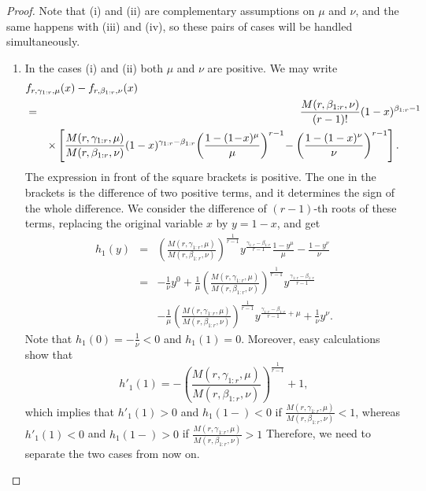 \documentclass [11pt]{article}
\begin{document}
\begin{proof}
Note that (i) %
and (ii) %
are complementary assumptions on $\mu$ and $\nu$, and the same happens with (iii) %
and (iv), %
so these pairs of cases will be handled simultaneously.
\begin{enumerate}%
\item[(a)]
In the cases (i) and (ii) %
both $\mu$  and $\nu$ are positive. We may write
\begin{eqnarray}
\lefteqn{f_{r,\gamma_{1:r},\mu}(x) - f_{r,\beta_{1:r},\nu}(x)} \nonumber \\
 & = &
\frac{M(r,\beta_{1:r},\nu)}{(r-1)!}(1-x)^{\beta_{1:r}-1} \nonumber \\
 & & \times
 \left[\frac{M(r,\gamma_{1:r},\mu)}{M(r,\beta_{1:r},\nu)}
  (1-x)^{\gamma_{1:r}-\beta_{1:r}}
\! \left( \frac{1-(1\!-\!x)^\mu}{\mu}\right)^{r-1}
\! - \left( \frac{1-(1-x)^\nu}{\nu}\right)^{r-1}\right].\qquad 
\label{4}
\end{eqnarray}
The expression in front of the square brackets is positive. The one in the brackets is the difference of two positive terms, and it determines the sign of the whole difference.
We consider the difference of $(r-1)$-th roots of these terms, replacing the original variable $x$ by $y=1-x$, and get
\begin{eqnarray}
h_1(y) & = & 
  \left(\frac{M(r,\gamma_{1:r},\mu)}{M(r,\beta_{1:r},\nu)}\right)^{\frac1{r-1}}
y^{\frac{\gamma_{1:r}-\beta_{1:r}}{r-1}}
\frac{1-y^\mu}{\mu} - \frac{1-y^\nu}{\nu} \nonumber \\
& = & -\frac{1}{\nu}y^0 + \frac{1}{\mu}
 \left(\frac{M(r,\gamma_{1:r},\mu)}{M(r,\beta_{1:r},\nu)}\right)^{\frac1{r-1}}
y^{\frac{\gamma_{1:r}-\beta_{1:r}}{r-1}} \nonumber \\
& & - \frac{1}{\mu} \left(\frac{M(r,\gamma_{1:r},\mu)}{M(r,\beta_{1:r},\nu)}\right)^{\frac1{r-1}}
y^{\frac{\gamma_{1:r}-\beta_{1:r}}{r-1}+\mu} + \frac{1}{\nu}y^\nu.
\label{5}
\end{eqnarray}
Note that $h_1(0) = -\frac{1}{\nu}<0$ and $h_1(1)=0$.
Moreover, easy calculations show that
\begin{equation*}
\label{6}
h'_1(1) = - \left(\frac{M(r,\gamma_{1:r},\mu)}{M(r,\beta_{1:r},\nu)}\right)^{\frac1{r-1}}
 +1,
\end{equation*}
which implies that $h'_1(1) >0 $ and $h_1(1-)<0$ if $\frac{M(r,\gamma_{1:r},\mu)}{M(r,\beta_{1:r},\nu)}<1$,
whereas $h'_1(1) <0 $ and $h_1(1-)>0$ if 
$\frac{M(r,\gamma_{1:r},\mu)}{M(r,\beta_{1:r},\nu)}>1$
Therefore, we need to separate the two cases from now on. 


\end{enumerate}
\end{proof}
\end{document}
